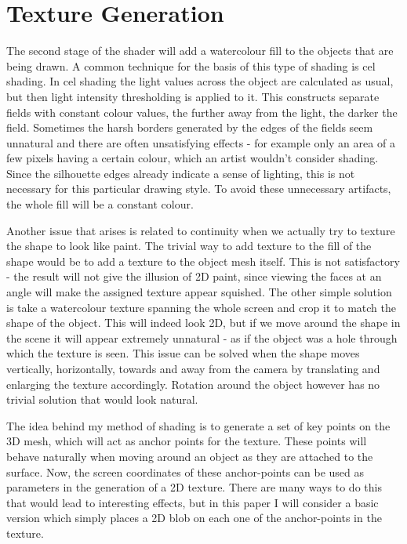 \documentclass[a4paper, 12pt]{article}
\begin{document}
\section{Texture Generation}

The second stage of the shader will add a watercolour fill to the objects that are being drawn. A common technique for the basis of this type of shading is cel shading. In cel shading the light values across the object are calculated as usual, but then light intensity thresholding is applied to it. This constructs separate fields with constant colour values, the further away from the light, the darker the field. Sometimes the harsh borders generated by the edges of the fields seem unnatural and there are often unsatisfying effects - for example only an area of a few pixels having a certain colour, which an artist wouldn't consider shading. Since the silhouette edges already indicate a sense of lighting, this is not necessary for this particular drawing style. To avoid these unnecessary artifacts, the whole fill will be a constant colour.

Another issue that arises is related to continuity when we actually try to texture the shape to look like paint. The trivial way to add texture to the fill of the shape would be to add a texture to the object mesh itself. This is not satisfactory - the result will not give the illusion of 2D paint, since viewing the faces at an angle will make the assigned texture appear squished. The other simple solution is take a watercolour texture spanning the whole screen and crop it to match the shape of the object. This will indeed look 2D, but if we move around the shape in the scene it will appear extremely unnatural - as if the object was a hole through which the texture is seen. This issue can be solved when the shape moves vertically, horizontally, towards and away from the camera by translating and enlarging the texture accordingly. Rotation around the object however has no trivial solution that would look natural.

The idea behind my method of shading is to generate a set of key points on the 3D mesh, which will act as anchor points for the texture. These points will behave naturally when moving around an object as they are attached to the surface. Now, the screen coordinates of these anchor-points can be used as parameters in the generation of a 2D texture. There are many ways to do this that would lead to interesting effects, but in this paper I will consider a basic version which simply places a 2D blob on each one of the anchor-points in the texture.
\end{document}
